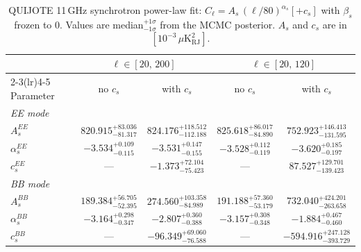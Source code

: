 \begin{table}[htbp]
\centering
\caption{QUIJOTE 11\,GHz synchrotron power-law fit: $C_\ell = A_s\,(\ell/80)^{\alpha_s} [+ c_s]$ with $\beta_s$ frozen to 0. Values are median$^{+1\sigma}_{-1\sigma}$ from the MCMC posterior. $A_s$ and $c_s$ are in $[10^{-3}\,\mu\mathrm{K}^2_\mathrm{RJ}]$.}
\label{tab:sync_11ghz}
\begin{tabular}{lcccc}
\toprule
& \multicolumn{2}{c}{$\ell \in [20,\,200]$} & \multicolumn{2}{c}{$\ell \in [20,\,120]$} \\
\cmidrule(lr){2-3}\cmidrule(lr){4-5}
Parameter & no $c_s$ & with $c_s$ & no $c_s$ & with $c_s$ \\
\midrule
\multicolumn{5}{l}{\textit{EE mode}} \\
$A_s^{EE}$ & $820.915^{+83.036}_{-81.317}$ & $824.176^{+118.512}_{-112.188}$ & $825.618^{+86.017}_{-84.890}$ & $752.923^{+146.413}_{-131.595}$ \\
$\alpha_s^{EE}$ & $-3.534^{+0.109}_{-0.115}$ & $-3.531^{+0.147}_{-0.155}$ & $-3.528^{+0.112}_{-0.119}$ & $-3.620^{+0.185}_{-0.197}$ \\
$c_s^{EE}$ & \multicolumn{1}{c}{---} & $-1.373^{+72.104}_{-75.423}$ & \multicolumn{1}{c}{---} & $87.527^{+129.701}_{-139.423}$ \\
\midrule
\multicolumn{5}{l}{\textit{BB mode}} \\
$A_s^{BB}$ & $189.384^{+56.705}_{-52.395}$ & $274.560^{+103.358}_{-84.989}$ & $191.188^{+57.360}_{-53.179}$ & $732.040^{+424.201}_{-263.658}$ \\
$\alpha_s^{BB}$ & $-3.164^{+0.298}_{-0.347}$ & $-2.807^{+0.360}_{-0.388}$ & $-3.157^{+0.308}_{-0.348}$ & $-1.884^{+0.467}_{-0.460}$ \\
$c_s^{BB}$ & \multicolumn{1}{c}{---} & $-96.349^{+69.060}_{-76.588}$ & \multicolumn{1}{c}{---} & $-594.916^{+247.128}_{-393.729}$ \\
\bottomrule
\end{tabular}
\end{table}
